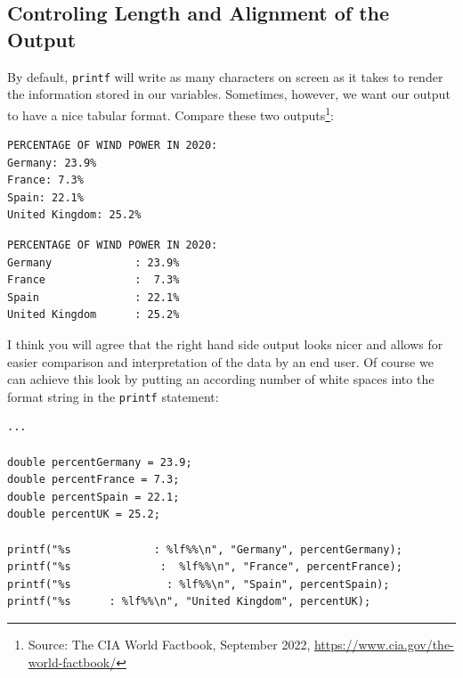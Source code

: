 \subsection{Controling Length and Alignment of the Output}
By default, \texttt{printf} will write as many characters on screen as it takes to render the information stored in our variables. Sometimes, however, we want our output to have a nice tabular format. Compare these two outputs\footnote{Source: The CIA World Factbook, September 2022, \url{https://www.cia.gov/the-world-factbook/}}:
\begin{tcbraster}[raster columns=2,
                  raster equal height,
                  nobeforeafter,
                  raster column skip=0.2cm]
\begin{cmdbox}
\begin{verbatim}
PERCENTAGE OF WIND POWER IN 2020:
Germany: 23.9%
France: 7.3%
Spain: 22.1%
United Kingdom: 25.2%
\end{verbatim}
\end{cmdbox}
%
\begin{cmdbox}
\begin{verbatim}
PERCENTAGE OF WIND POWER IN 2020:
Germany             : 23.9%
France              :  7.3%
Spain               : 22.1%
United Kingdom      : 25.2%
\end{verbatim}
\end{cmdbox}
\end{tcbraster}

I think you will agree that the right hand side output looks nicer and allows for easier comparison and interpretation of the data by an end user. Of course we can achieve this look by putting an according number of white spaces into the format string in the \texttt{printf} statement:
\begin{codebox}[manuallyAlignedOutput.c]
\begin{verbatim}
...

double percentGermany = 23.9;
double percentFrance = 7.3;
double percentSpain = 22.1;
double percentUK = 25.2;

printf("%s             : %lf%%\n", "Germany", percentGermany);
printf("%s              :  %lf%%\n", "France", percentFrance);
printf("%s               : %lf%%\n", "Spain", percentSpain);
printf("%s      : %lf%%\n", "United Kingdom", percentUK);
\end{verbatim}
\end{codebox}

